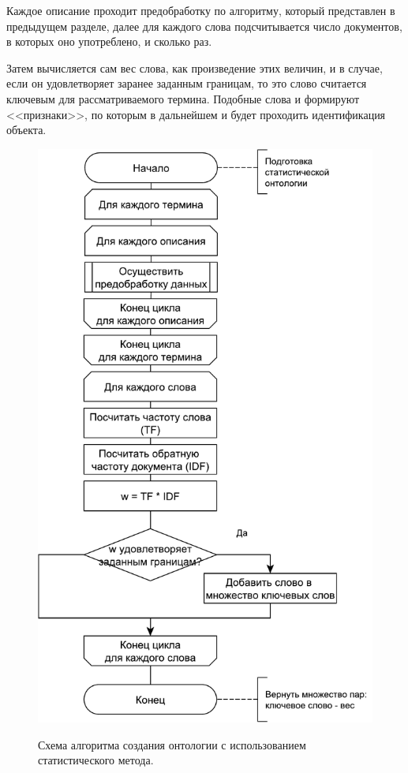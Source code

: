 Каждое описание проходит предобработку по алгоритму, который представлен в предыдущем разделе, далее для каждого слова подсчитывается число документов, в которых оно употреблено, и сколько раз. 

Затем вычисляется сам вес слова, как произведение этих величин, и в случае, если он удовлетворяет заранее заданным границам, то это слово считается ключевым для рассматриваемого термина. Подобные слова и формируют <<признаки>>, по которым в дальнейшем и будет проходить идентификация объекта.
\begin{figure}[h]
	\begin{center}
		{\includegraphics[scale = 0.6]{img/schemes/pdf/tf_idf.pdf}}
		\caption{Схема алгоритма создания онтологии с использованием статистического метода.}
		\label{fig29:image}
	\end{center}
\end{figure}

